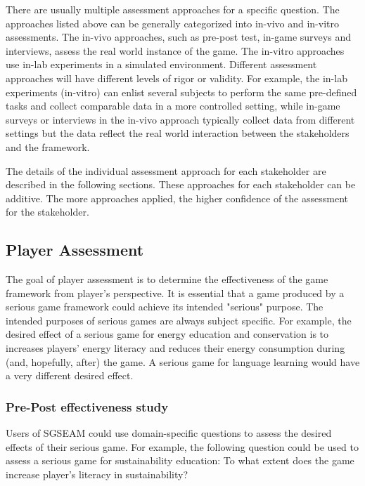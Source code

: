 There are usually multiple assessment approaches for a specific question. The approaches listed above can be generally categorized into in-vivo and in-vitro assessments. The in-vivo approaches, such as pre-post test, in-game surveys and interviews, assess the real world instance of the game. The in-vitro approaches use in-lab experiments in a simulated environment. Different assessment
approaches will have different levels of rigor or validity. For example, the in-lab experiments (in-vitro) can enlist several subjects to perform the same pre-defined tasks and collect comparable data in a more controlled setting, while in-game surveys or interviews in the in-vivo approach typically collect data from different settings but the data reflect the real world interaction between the stakeholders and the framework.

The details of the individual assessment approach for each stakeholder are described in the following sections. These approaches for each stakeholder can be additive. The more approaches applied, the higher confidence of the assessment for the stakeholder.

\subsection{Player Assessment}

The goal of player assessment is to determine the effectiveness of the game
framework from player's perspective. It is essential that a game produced by a serious game
framework could achieve its intended "serious" purpose. The intended purposes of serious games are
always subject specific. For example, the desired effect of a serious game for
energy education and conservation is to increases players' energy literacy and
reduces their energy consumption during (and, hopefully, after) the game. A serious game for
language learning would have a very different desired effect.

\subsubsection{Pre-Post effectiveness study}
\label{Pre Post effectiveness study}

Users of SGSEAM could use domain-specific questions to assess the desired effects of their
serious game. For example, the following question could be used to assess a serious
game for sustainability education: To what extent does the game increase player's literacy in
sustainability? 

